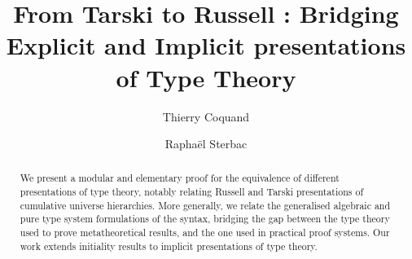 \documentclass[a4paper, UKenglish, cleveref, autoref, thm-restate, screen]{lipics-v2021}
\title{From Tarski to Russell : Bridging Explicit and Implicit presentations of Type Theory}
\author{Thierry Coquand}{Chalmers University of Technology -- University of Gothenburg, Sweden}{coquand@chalmers.se}{https://orcid.org/0000-0002-5429-5153}{}
\author{Raphaël Sterbac}{ENS Paris-Saclay -- Université Paris-Saclay, France}{raphael.sterbac@ens-paris-saclay.fr}{https://orcid.org/0009-0001-6779-8323}{}
\begin{document}
\maketitle

\begin{abstract}
    We present a modular and elementary proof for the equivalence of different
    presentations of type theory, notably relating Russell and Tarski presentations of cumulative universe hierarchies. More generally, we relate the generalised algebraic and pure type system formulations of the syntax, bridging the gap between the type theory used to prove metatheoretical results, and the one used in practical proof systems. Our work extends initiality results to implicit presentations of type theory.
\end{abstract}













\appendix


\end{document}
